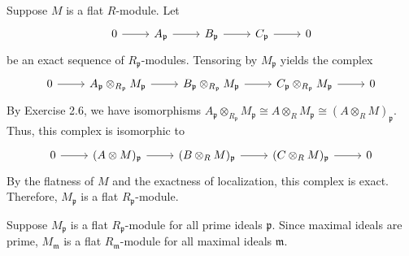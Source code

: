 \documentclass[../../master.tex]{subfiles}
\begin{document}
\begin{solution}
    Suppose $M$ is a flat $R$-module.
    Let
    \[
    \begin{tikzcd}
        0 & A_{\mathfrak{p}} & B_{\mathfrak{p}} & C_{\mathfrak{p}} & 0
        \arrow[from=1-1, to=1-2]
        \arrow[from=1-2, to=1-3]
        \arrow[from=1-3, to=1-4]
        \arrow[from=1-4, to=1-5] 
    \end{tikzcd}
    \]
    be an exact sequence of $R_{\mathfrak{p}}$-modules.
    Tensoring by $M_{\mathfrak{p}}$ yields the complex
    \[
    \begin{tikzcd}
        0 & A_{\mathfrak{p}} \otimes_{R_\mathfrak{p}} M_{\mathfrak{p}} & B_{\mathfrak{p}} \otimes_{R_\mathfrak{p}} M_{\mathfrak{p}} & C_{\mathfrak{p}} \otimes_{R_\mathfrak{p}} M_{\mathfrak{p}} & 0
        \arrow[from=1-1, to=1-2]
        \arrow[from=1-2, to=1-3]
        \arrow[from=1-3, to=1-4]
        \arrow[from=1-4, to=1-5] 
    \end{tikzcd}
    \]
    By Exercise 2.6, we have isomorphisms $A_{\mathfrak{p}} \otimes_{R_{\mathfrak{p}}} M_{\mathfrak{p}} \cong A \otimes_R M_{\mathfrak{p}} \cong (A \otimes_R M)_{\mathfrak{p}}$.
    Thus, this complex is isomorphic to
    \[
    \begin{tikzcd}
        0 & (A \otimes M)_{\mathfrak{p}} & (B \otimes_R M)_{\mathfrak{p}} & (C \otimes_R M)_{\mathfrak{p}} & 0
        \arrow[from=1-1, to=1-2]
        \arrow[from=1-2, to=1-3]
        \arrow[from=1-3, to=1-4]
        \arrow[from=1-4, to=1-5] 
    \end{tikzcd}
    \]
    By the flatness of $M$ and the exactness of localization, this complex is exact.
    Therefore, $M_{\mathfrak{p}}$ is a flat $R_{\mathfrak{p}}$-module.

    Suppose $M_{\mathfrak{p}}$ is a flat $R_{\mathfrak{p}}$-module for all prime ideals $\mathfrak{p}$.
    Since maximal ideals are prime, $M_{\mathfrak{m}}$ is a flat $R_{\mathfrak{m}}$-module for all maximal ideals $\mathfrak{m}$.


\end{solution}
\end{document}
